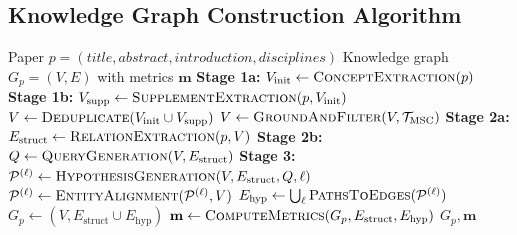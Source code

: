 
\subsection{Knowledge Graph Construction Algorithm}

\begin{algorithm}[t]
\caption{Multi-Stage Knowledge Graph Construction}
\label{alg:kg_construction}
\begin{algorithmic}[1]
\REQUIRE Paper $p = (\textit{title}, \textit{abstract}, \textit{introduction}, \textit{disciplines})$
\ENSURE Knowledge graph $G_p = (V, E)$ with metrics $\mathbf{m}$
\STATE \textbf{Stage 1a:} $V_{\text{init}} \leftarrow \textsc{ConceptExtraction}(p)$ 
\STATE \textbf{Stage 1b:} $V_{\text{supp}} \leftarrow \textsc{SupplementExtraction}(p, V_{\text{init}})$ 
\STATE $V \leftarrow \textsc{Deduplicate}(V_{\text{init}} \cup V_{\text{supp}})$
\STATE $V \leftarrow \textsc{GroundAndFilter}(V, \mathcal{T}_{\text{MSC}})$ 
\STATE \textbf{Stage 2a:} $E_{\text{struct}} \leftarrow \textsc{RelationExtraction}(p, V)$ 
\STATE \textbf{Stage 2b:} $Q \leftarrow \textsc{QueryGeneration}(V, E_{\text{struct}})$ 
\STATE \textbf{Stage 3:} 
    \STATE $\mathcal{P}^{(\ell)} \leftarrow \textsc{HypothesisGeneration}(V, E_{\text{struct}}, Q, \ell)$
    \STATE $\mathcal{P}^{(\ell)} \leftarrow \textsc{EntityAlignment}(\mathcal{P}^{(\ell)}, V)$ 
\ENDFOR
\STATE $E_{\text{hyp}} \leftarrow \bigcup_\ell \textsc{PathsToEdges}(\mathcal{P}^{(\ell)})$
\STATE $G_p \leftarrow (V, E_{\text{struct}} \cup E_{\text{hyp}})$
\STATE $\mathbf{m} \leftarrow \textsc{ComputeMetrics}(G_p, E_{\text{struct}}, E_{\text{hyp}})$ 
\RETURN $G_p, \mathbf{m}$
\end{algorithmic}
\end{algorithm}



